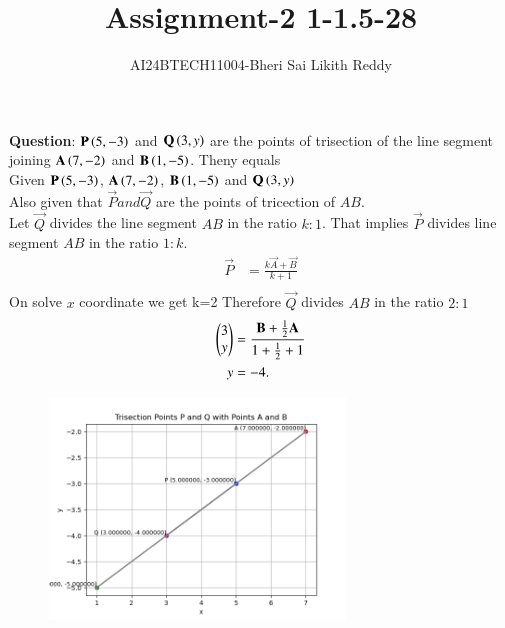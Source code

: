 \documentclass[journal]{IEEEtran}
\begin{document}

\onecolumn
\newpage
\title{Assignment-2  1-1.5-28}
\author{AI24BTECH11004-Bheri Sai Likith Reddy}
\maketitle
\textbf{Question}:
 $\mathbf{P}\left(5,-3\right)$ and $\mathbf{Q}\left(3,y\right)$ are the points of trisection of the line segment joining $\mathbf{A}\left(7,-2\right)$ and $\mathbf{B}\left(1,-5\right)$. Theny equals\\
\solution Given $\mathbf{P}\left(5,-3\right)$, $\mathbf{A}\left(7,-2\right)$, $\mathbf{B}\left(1,-5\right)$ and $\mathbf{Q}\left(3,y\right)$\\
Also given that $\vec{P} and \vec{Q} $ are the points of tricection of $AB$.\\
Let $\vec{Q}$ divides the line segment $AB$ in the ratio $k:1$.
That implies $\vec{P}$ divides line segment $AB$ in the ratio $1:k$.
\begin{align*}
	\vec{P}&= \frac{k\vec{A} +\vec{B}}{k+1}\\
\end{align*}
On solve $x$ coordinate we get k=2
Therefore $\vec{Q}$ divides $AB$ in the ratio $2:1$\\
\begin{align*}
	\begin{pmatrix}3\\ y\end{pmatrix}&=\frac{\mathbf{B} +\frac{1}{2}\mathbf{A} }{1+\frac{1}{2}+1 }\\
	y&=-4.
\end{align*}
\begin{table}[h!]
	\centering
	
\end{table}
\begin{figure}[h!]
    \centering
    \includegraphics[width=0.7\textwidth]{figs/figasgn2.png}
\end{figure}
\end{document}
